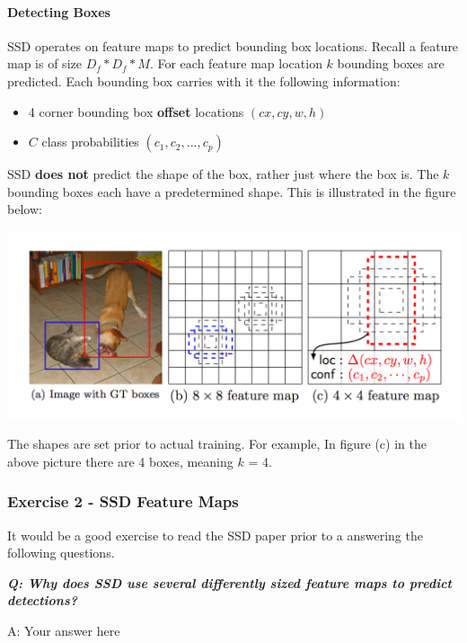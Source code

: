\documentclass[11pt]{article}
\makeatletter
\def\maxwidth{\ifdim\Gin@nat@width>\linewidth\linewidth
    \else\Gin@nat@width\fi}
\let\Oldincludegraphics\includegraphics
\renewcommand{\includegraphics}[1]{\Oldincludegraphics[width=.8\maxwidth]{#1}}
\providecommand{\tightlist}{%
      \setlength{\itemsep}{0pt}\setlength{\parskip}{0pt}}
\makeatother
\begin{document}
\hypertarget{detecting-boxes}{%
\paragraph{Detecting Boxes}\label{detecting-boxes}}

SSD operates on feature maps to predict bounding box locations. Recall a
feature map is of size \(D_f * D_f * M\). For each feature map location
\(k\) bounding boxes are predicted. Each bounding box carries with it
the following information:

\begin{itemize}
\tightlist
\item
  4 corner bounding box \textbf{offset} locations \((cx, cy, w, h)\)
\item
  \(C\) class probabilities \((c_1, c_2, ..., c_p)\)
\end{itemize}

SSD \textbf{does not} predict the shape of the box, rather just where
the box is. The \(k\) bounding boxes each have a predetermined shape.
This is illustrated in the figure below:

\includegraphics{./assets/ssd_feature_maps.png}

The shapes are set prior to actual training. For example, In figure (c)
in the above picture there are 4 boxes, meaning \(k\) = 4.

    \hypertarget{exercise-2---ssd-feature-maps}{%
\subsubsection{Exercise 2 - SSD Feature
Maps}\label{exercise-2---ssd-feature-maps}}

It would be a good exercise to read the SSD paper prior to a answering
the following questions.

\textbf{\emph{Q: Why does SSD use several differently sized feature maps
to predict detections?}}

    A: Your answer here
\end{document}
